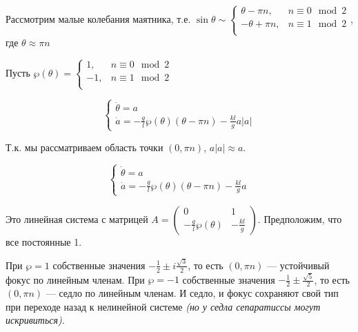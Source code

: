 Рассмотрим малые колебания маятника, т.е. \(\sin \theta \sim \begin{cases}
    \theta - \pi n,  & n \equiv 0 \mod 2 \\
    -\theta + \pi n, & n \equiv 1 \mod 2 \\
\end{cases}\), где \(\theta \approx \pi n\)

Пусть \(\wp(\theta) = \begin{cases}
    1,   & n \equiv 0 \mod 2 \\
    - 1, & n \equiv 1 \mod 2 \\
\end{cases}\)

\[\begin{cases}
        \dot \theta = a \\
        \dot a = - \frac{g}{l} \wp(\theta) (\theta - \pi n) - \frac{kl}{g} a|a|
    \end{cases}\]

Т.к. мы рассматриваем область точки \((0, \pi n)\), \(a|a| \approx a\).

\[\begin{cases}
        \dot \theta = a \\
        \dot a = - \frac{g}{l} \wp(\theta) (\theta - \pi n) - \frac{kl}{g} a
    \end{cases}\]

Это линейная система с матрицей \(A = \begin{pmatrix} 0 & 1 \\ - \frac{g}{l} \wp(\theta) & - \frac{kl}{g} \end{pmatrix}\). Предположим, что все постоянные 1.

При \(\wp = 1\) собственные значения \( - \frac{1}{2} \pm i \frac{\sqrt{3}}{2}\), то есть \((0, \pi n)\) --- устойчивый фокус по линейным членам. При \(\wp = - 1\) собственные значения \( - \frac{1}{2} \pm \frac{\sqrt{5}}{2} \), то есть \((0, \pi n)\) --- седло по линейным членам. И седло, и фокус сохраняют свой тип при переходе назад к нелинейной системе \textit{(но у седла сепаратиссы могут искривиться)}.

\begin{figure}[h]
    \centering
    
\end{figure}

\section{}

